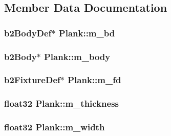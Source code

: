 \subsection{Member Data Documentation}
\hypertarget{classPlank_a2d0f77c8e5716733d9715bdd641987b4}{
\subsubsection[{m\-\_\-bd}]{\setlength{\rightskip}{0pt plus 5cm}b2\-Body\-Def$\ast$ Plank\-::m\-\_\-bd\hspace{0.3cm}{\ttfamily [private]}}}\label{classPlank_a2d0f77c8e5716733d9715bdd641987b4}
\hypertarget{classPlank_a311d983aad3e0cd5d5059edb37f5e1b6}{
\subsubsection[{m\-\_\-body}]{\setlength{\rightskip}{0pt plus 5cm}b2\-Body$\ast$ Plank\-::m\-\_\-body\hspace{0.3cm}{\ttfamily [private]}}}\label{classPlank_a311d983aad3e0cd5d5059edb37f5e1b6}
\hypertarget{classPlank_ad9ee0dbf22fe79689efddda7d7a94347}{
\subsubsection[{m\-\_\-fd}]{\setlength{\rightskip}{0pt plus 5cm}b2\-Fixture\-Def$\ast$ Plank\-::m\-\_\-fd\hspace{0.3cm}{\ttfamily [private]}}}\label{classPlank_ad9ee0dbf22fe79689efddda7d7a94347}
\hypertarget{classPlank_aba0b2459614c6427abf50c5b16c623c3}{
\subsubsection[{m\-\_\-thickness}]{\setlength{\rightskip}{0pt plus 5cm}float32 Plank\-::m\-\_\-thickness\hspace{0.3cm}{\ttfamily [private]}}}\label{classPlank_aba0b2459614c6427abf50c5b16c623c3}
\hypertarget{classPlank_a188c7ef7af7fdc72d9e4925299248677}{
\subsubsection[{m\-\_\-width}]{\setlength{\rightskip}{0pt plus 5cm}float32 Plank\-::m\-\_\-width\hspace{0.3cm}{\ttfamily [private]}}}\label{classPlank_a188c7ef7af7fdc72d9e4925299248677}
